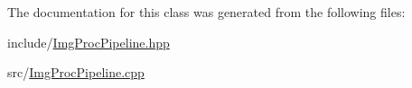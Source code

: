 \-The documentation for this class was generated from the following files\-:\begin{DoxyCompactItemize}
\item 
include/\hyperlink{ImgProcPipeline_8hpp}{\-Img\-Proc\-Pipeline.\-hpp}\item 
src/\hyperlink{ImgProcPipeline_8cpp}{\-Img\-Proc\-Pipeline.\-cpp}\end{DoxyCompactItemize}
